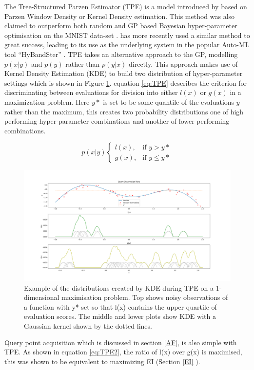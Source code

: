 \documentclass{article}
\begin{document}
			The Tree-Structured Parzen Estimator (TPE) is a model introduced by \cite{20} based on Parzen Window Density or Kernel Density estimation. This method was also claimed to outperform both random and GP based Bayesian hyper-parameter optimisation on the MNIST data-set \cite{20}. \cite{32} has more recently used a similar method to great success, leading to its use as the underlying system in the popular Auto-ML tool “HyBandSter” \cite{34}.
			TPE takes an alternative approach to the GP, modelling \(p(x|y)\) and \(p(y)\) rather than \(p(y|x)\) directly. This approach makes use of Kernel Density Estimation (KDE) to build two distribution of hyper-parameter settings which is shown in Figure \ref{fig:tpe1}. equation \ref{eq:TPE} describes the criterion for discriminating between evaluations for division into either \(l(x)\) or \(g(x)\) in a maximization problem. Here \(y*\) is set to be some quantile of the evaluations \(y\) rather than the maximum, this creates two probability distributions one of high performing hyper-parameter combinations and another of lower performing combinations. 

			\begin{equation}\label{eq:TPE} p(x|y) \begin{cases}
									l(x), & \text{if } y>y*\\
									g(x), & \text{if } y\leq y*\end{cases} \end{equation}

			\begin{figure}[h]

			\includegraphics[trim=20 0 0 0 ,scale=0.25]{TPE1.png}

			\caption{Example of the distributions created by KDE during TPE on a 1-dimensional maximisation problem. Top shows noisy observations of a function with y* set so that l(x) contains the upper quartile of evaluation scores. The middle and lower plots show KDE with a Gaussian kernel shown by the dotted lines.}
			\label{fig:tpe1}
			\end{figure}
			Query point acquisition which is discussed in section \ref{AF}, is also simple with TPE. As shown in equation \ref{eq:TPE2}, the ratio of l(x) over g(x) is maximised, this was shown to be equivalent to maximizing EI \cite{20} (Section \ref{EI} ).
\end{document}
